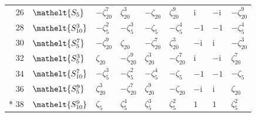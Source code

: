 \documentclass[10pt,a4paper]{article}
\numberwithin{equation}{section}
\newcommand{\eltfont}[1]{{\let\sigma\eltsigma\mathelt{#1}}}
\newcommand{\cls}[1]{\eltfont{#1}}
\newcommand{\iunit}{\mathrm{i}}
\newcommand{\rootunity}[1]{\zeta_{#1}}
\begin{document}
{\begin{longtable}{@{}rllllllll@{}}
26 & $\cls{S_{5}}$ & $-\rootunity{20}^{7}$ & $\rootunity{20}^{3}$ & $-\rootunity{20}$ & $\rootunity{20}^{9}$ & $\iunit{}$ & $-\iunit{}$ & $-\rootunity{20}^{9}$\\
28 & $\cls{S_{10}^{3}}$ & $-\rootunity{5}^{2}$ & $-\rootunity{5}^{3}$ & $-\rootunity{5}$ & $-\rootunity{5}^{4}$ & $-1$ & $-1$ & $-\rootunity{5}^{4}$\\
30 & $\cls{S_{5}^{7}}$ & $-\rootunity{20}^{9}$ & $\rootunity{20}$ & $-\rootunity{20}^{7}$ & $\rootunity{20}^{3}$ & $-\iunit{}$ & $\iunit{}$ & $-\rootunity{20}^{3}$\\
32 & $\cls{S_{5}^{3}}$ & $\rootunity{20}$ & $-\rootunity{20}^{9}$ & $\rootunity{20}^{3}$ & $-\rootunity{20}^{7}$ & $\iunit{}$ & $-\iunit{}$ & $\rootunity{20}^{7}$\\
34 & $\cls{S_{10}^{7}}$ & $-\rootunity{5}^{3}$ & $-\rootunity{5}^{2}$ & $-\rootunity{5}^{4}$ & $-\rootunity{5}$ & $-1$ & $-1$ & $-\rootunity{5}$\\
36 & $\cls{S_{5}^{9}}$ & $\rootunity{20}^{3}$ & $-\rootunity{20}^{7}$ & $\rootunity{20}^{9}$ & $-\rootunity{20}$ & $-\iunit{}$ & $\iunit{}$ & $\rootunity{20}$\\*
38 & $\cls{S_{10}^{9}}$ & $\rootunity{5}$ & $\rootunity{5}^{4}$ & $\rootunity{5}^{3}$ & $\rootunity{5}^{2}$ & $1$ & $1$ & $\rootunity{5}^{2}$\\
\bottomrule\end{longtable}}
\end{document}
